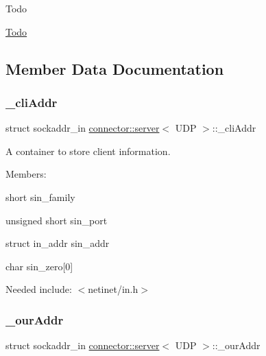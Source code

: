 \begin{DoxyRefDesc}{Todo}
\item[\hyperlink{todo__todo000017}{Todo}]\end{DoxyRefDesc}


\subsection{Member Data Documentation}
\mbox{\label{classconnector_1_1server_3_01UDP_01_4_af1b055359697a46b5a82772b5ce1e092}} 
\subsubsection{\texorpdfstring{\+\_\+cli\+Addr}{\_cliAddr}}
{\footnotesize\ttfamily struct sockaddr\+\_\+in \hyperlink{classconnector_1_1server}{connector\+::server}$<$ U\+DP $>$\+::\+\_\+cli\+Addr\hspace{0.3cm}{\ttfamily [private]}}



A container to store client information. 

Members\+:
\begin{DoxyItemize}
\item {\ttfamily short} sin\+\_\+family
\item {\ttfamily unsigned short} sin\+\_\+port
\item {\ttfamily struct} in\+\_\+addr sin\+\_\+addr
\item {\ttfamily char} sin\+\_\+zero\mbox{[}0\mbox{]}
\end{DoxyItemize}

Needed include\+: {\ttfamily $<$netinet/in.\+h$>$} \mbox{\label{classconnector_1_1server_3_01UDP_01_4_a6325152e359abd6a6f8973b6235e566c}} 
\subsubsection{\texorpdfstring{\+\_\+our\+Addr}{\_ourAddr}}
{\footnotesize\ttfamily struct sockaddr\+\_\+in \hyperlink{classconnector_1_1server}{connector\+::server}$<$ U\+DP $>$\+::\+\_\+our\+Addr\hspace{0.3cm}{\ttfamily [private]}}




